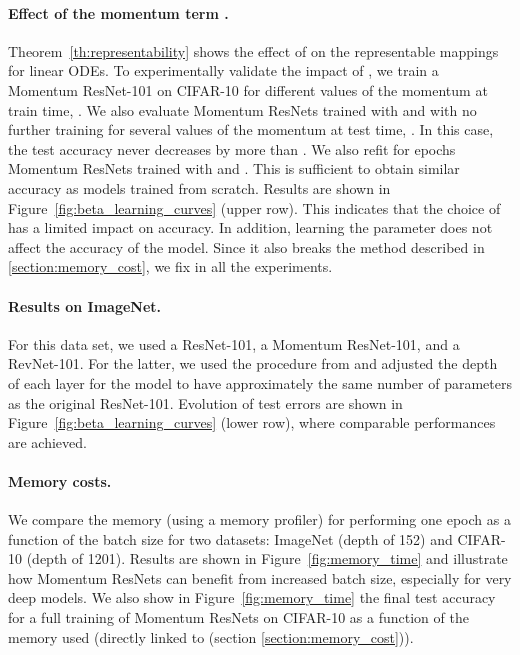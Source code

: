 \documentclass{article}
\begin{document}
\paragraph{Effect of the momentum term .}

Theorem~\ref{th:representability} shows the effect of  on the representable mappings for linear ODEs.
To experimentally validate the impact of , we train a Momentum ResNet-101 on CIFAR-10 for different values of the momentum at train time, . We also evaluate Momentum ResNets trained with  and  with no further training for several values of the momentum at test time, . In this case, the test accuracy never decreases by more than .  We also refit for  epochs Momentum ResNets trained with  and . This is sufficient to obtain similar accuracy as models trained from scratch. Results are shown in Figure~\ref{fig:beta_learning_curves} (upper row). This indicates that the choice of  has a limited impact on accuracy.  In addition, learning the parameter  does not affect the accuracy of the model. Since it also breaks the method described in \ref{section:memory_cost}, we fix  in all the experiments.



\paragraph{Results on ImageNet.}
For this data set, we used a ResNet-101, a Momentum ResNet-101, and a RevNet-101. For the latter, we used the procedure from \citet{gomez2017reversible} and adjusted the depth of each layer for the model to have approximately the same number of parameters as the original ResNet-101. Evolution of test errors are shown in Figure~\ref{fig:beta_learning_curves} (lower row), where comparable performances are achieved.
\vspace{-0.5em}
\paragraph{Memory costs.}
We compare the memory (using a memory profiler) for performing one epoch as a function of the batch size for two datasets: ImageNet (depth of 152) and CIFAR-10 (depth of 1201). Results are shown in Figure~\ref{fig:memory_time} and illustrate how Momentum ResNets can benefit from increased batch size, especially for very deep models. We also show in Figure~\ref{fig:memory_time} the final test accuracy for a full training of Momentum ResNets on CIFAR-10 as a function of the memory used (directly linked to  (section \ref{section:memory_cost})).
\end{document}

